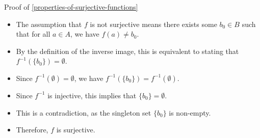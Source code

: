 \begin{Proof}{Proof of \cref{properties-of-surjective-functions}}
\begin{itemize}
\begin{itemize}
                \item The assumption that $f$ is not surjective means there exists some $b_{0}\in B$ such that for all $a\in A$, we have $f(a)\neq b_{0}$.
                \item By the definition of the inverse image, this is equivalent to stating that $f^{-1}(\{b_{0}\})=\emptyset$.
                \item Since $f^{-1}(\emptyset)=\emptyset$, we have $f^{-1}(\{b_{0}\})=f^{-1}(\emptyset)$.
                \item Since $f^{-1}$ is injective, this implies that $\{b_{0}\}=\emptyset$.
                \item This is a contradiction, as the singleton set $\{b_{0}\}$ is non-empty.
                \item Therefore, $f$ is surjective.
            \end{itemize}
    \end{itemize}


\end{Proof}
